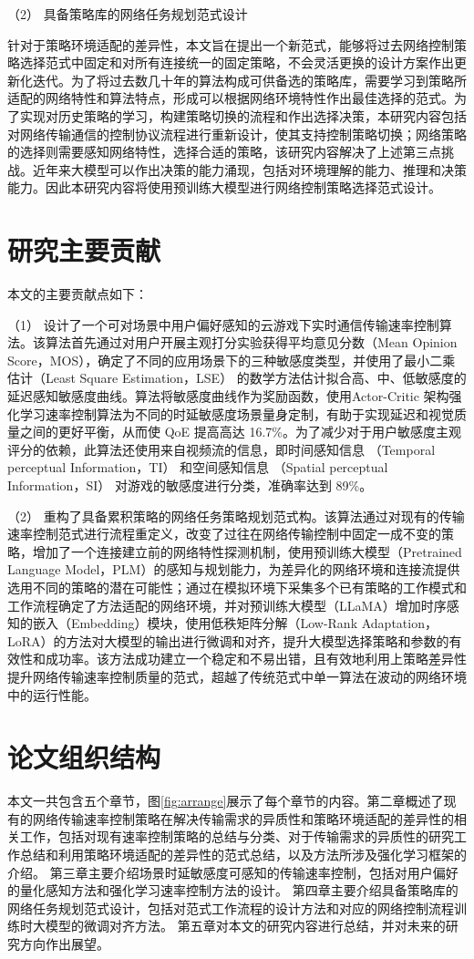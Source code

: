 （2） 具备策略库的网络任务规划范式设计

针对于策略环境适配的差异性，本文旨在提出一个新范式，能够将过去网络控制策略选择范式中固定和对所有连接统一的固定策略，不会灵活更换的设计方案作出更新化迭代。为了将过去数几十年的算法构成可供备选的策略库，需要学习到策略所适配的网络特性和算法特点，形成可以根据网络环境特性作出最佳选择的范式。为了实现对历史策略的学习，构建策略切换的流程和作出选择决策，本研究内容包括对网络传输通信的控制协议流程进行重新设计，使其支持控制策略切换；网络策略的选择则需要感知网络特性，选择合适的策略，该研究内容解决了上述第三点挑战。近年来大模型可以作出决策的能力涌现，包括对环境理解的能力、推理和决策能力。因此本研究内容将使用预训练大模型进行网络控制策略选择范式设计。

\section{研究主要贡献}
本文的主要贡献点如下：

（1） 设计了一个可对场景中用户偏好感知的云游戏下实时通信传输速率控制算法。该算法首先通过对用户开展主观打分实验获得平均意见分数（Mean Opinion Score，MOS），确定了不同的应用场景下的三种敏感度类型，并使用了最小二乘估计（Least Square Estimation，LSE） 的数学方法估计拟合高、中、低敏感度的延迟感知敏感度曲线。算法将敏感度曲线作为奖励函数，使用Actor-Critic 架构强化学习速率控制算法为不同的时延敏感度场景量身定制，有助于实现延迟和视觉质量之间的更好平衡，从而使 QoE 提高高达 16.7\%。为了减少对于用户敏感度主观评分的依赖，此算法还使用来自视频流的信息，即时间感知信息 （Temporal perceptual Information，TI） 和空间感知信息 （Spatial perceptual Information，SI） 对游戏的敏感度进行分类，准确率达到 89\%。

（2） 重构了具备累积策略的网络任务策略规划范式构。该算法通过对现有的传输速率控制范式进行流程重定义，改变了过往在网络传输控制中固定一成不变的策略，增加了一个连接建立前的网络特性探测机制，使用预训练大模型（Pretrained Language Model，PLM）的感知与规划能力，为差异化的网络环境和连接流提供选用不同的策略的潜在可能性；通过在模拟环境下采集多个已有策略的工作模式和工作流程确定了方法适配的网络环境，并对预训练大模型（LLaMA）增加时序感知的嵌入（Embedding）模块，使用低秩矩阵分解（Low-Rank Adaptation，LoRA）的方法对大模型的输出进行微调和对齐，提升大模型选择策略和参数的有效性和成功率。该方法成功建立一个稳定和不易出错，且有效地利用上策略差异性提升网络传输速率控制质量的范式，超越了传统范式中单一算法在波动的网络环境中的运行性能。


\section{论文组织结构}
本文一共包含五个章节，图\ref{fig:arrange}展示了每个章节的内容。第二章概述了现有的网络传输速率控制策略在解决传输需求的异质性和策略环境适配的差异性的相关工作，包括对现有速率控制策略的总结与分类、对于传输需求的异质性的研究工作总结和利用策略环境适配的差异性的范式总结，以及方法所涉及强化学习框架的介绍。
第三章主要介绍场景时延敏感度可感知的传输速率控制，包括对用户偏好的量化感知方法和强化学习速率控制方法的设计。
第四章主要介绍具备策略库的⽹络任务规划范式设计，包括对范式工作流程的设计方法和对应的网络控制流程训练时大模型的微调对齐方法。
第五章对本文的研究内容进行总结，并对未来的研究方向作出展望。

